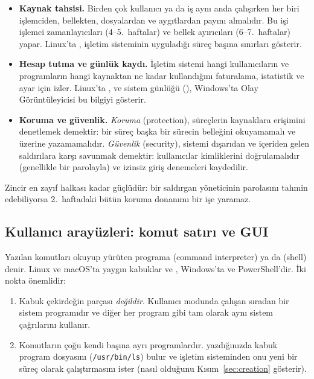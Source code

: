 \begin{itemize}
  \item \textbf{Kaynak tahsisi.} Birden çok kullanıcı ya da iş aynı anda çalışırken her biri işlemciden, bellekten, dosyalardan ve aygıtlardan payını almalıdır. Bu işi işlemci zamanlayıcıları (4--5.~haftalar) ve bellek ayırıcıları (6--7.~haftalar) yapar. Linux'ta , işletim sisteminin uyguladığı süreç başına sınırları gösterir.
  \item \textbf{Hesap tutma ve günlük kaydı.} İşletim sistemi hangi kullanıcıların ve programların hangi kaynaktan ne kadar kullandığını faturalama, istatistik ve ayar için izler. Linux'ta ,  ve sistem günlüğü (), Windows'ta Olay Görüntüleyicisi bu bilgiyi gösterir.
  \item \textbf{Koruma ve güvenlik.} \emph{Koruma} (protection), süreçlerin kaynaklara erişimini denetlemek demektir: bir süreç başka bir sürecin belleğini okuyamamalı ve üzerine yazamamalıdır. \emph{Güvenlik} (security), sistemi dışarıdan ve içeriden gelen saldırılara karşı savunmak demektir: kullanıcılar kimliklerini doğrulamalıdır (genellikle bir parolayla) ve izinsiz giriş denemeleri kaydedilir.
\end{itemize}

Zincir en zayıf halkası kadar güçlüdür: bir saldırgan yöneticinin parolasını tahmin edebiliyorsa 2.~haftadaki bütün koruma donanımı bir işe yaramaz.

\subsection{Kullanıcı arayüzleri: komut satırı ve GUI}

Yazılan komutları okuyup yürüten programa  (command interpreter) ya da  (shell) denir. Linux ve macOS'ta yaygın kabuklar  ve , Windows'ta  ve PowerShell'dir. İki nokta önemlidir:

\begin{enumerate}[leftmargin=1.4em]
  \item Kabuk çekirdeğin parçası \emph{değildir}. Kullanıcı modunda çalışan sıradan bir sistem programıdır ve diğer her program gibi tam olarak aynı sistem çağrılarını kullanır.
  \item Komutların çoğu kendi başına ayrı programlardır.  yazdığınızda kabuk program dosyasını (\texttt{/usr/\allowbreak bin/\allowbreak ls}) bulur ve işletim sisteminden onu yeni bir süreç olarak çalıştırmasını ister (nasıl olduğunu Kısım~\ref{sec:creation} gösterir).
\end{enumerate}

